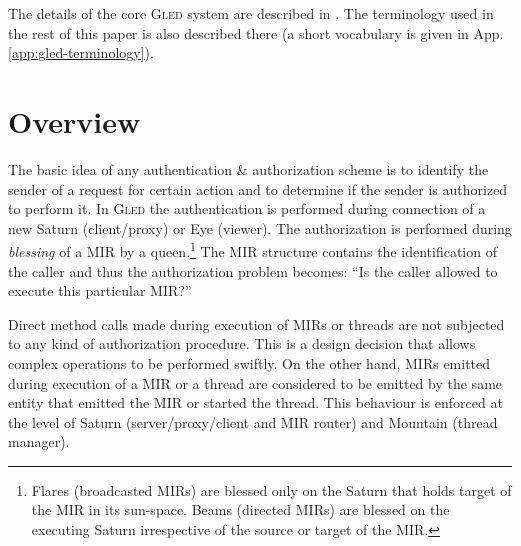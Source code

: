 \documentclass[a4paper,11pt]{article}
\def\gled{\textsc{Gled}\xspace}
\begin{document}
The details of the core \gled system are described in \cite{gled-1}.
The terminology used in the rest of this paper is also described there
(a short vocabulary is given in App.\,\ref{app:gled-terminology}).


\section{Overview}

The basic idea of any authentication \& authorization scheme is to
identify the sender of a request for certain action and to determine
if the sender is authorized to perform it. In \gled the authentication
is performed during connection of a new Saturn (client/proxy) or Eye
(viewer). The authorization is performed during \emph{blessing} of a
MIR by a queen.\footnote{Flares (broadcasted MIRs) are blessed only on
  the Saturn that holds target of the MIR in its sun-space. Beams
  (directed MIRs) are blessed on the executing Saturn irrespective of
  the source or target of the MIR.} %
The MIR structure contains the identification of the caller and thus
the authorization problem becomes: ``Is the caller allowed to execute
this particular MIR?''

Direct method calls made during execution of MIRs or threads are not
subjected to any kind of authorization procedure. This is a design
decision that allows complex operations to be performed swiftly. On
the other hand, MIRs emitted during execution of a MIR or a thread are
considered to be emitted by the same entity that emitted the MIR or
started the thread. This behaviour is enforced at the level of Saturn
(server/proxy/client and MIR router) and Mountain (thread manager).
\end{document}
